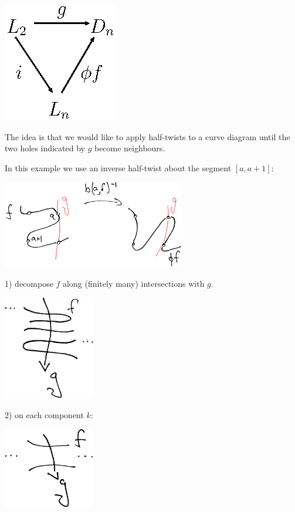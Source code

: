 \documentclass[12pt,a4paper]{article}
\begin{document}
\begin{center}
\includegraphics{halftwist-factor.eps}
\end{center}

The idea is that we would like to apply half-twists to a curve diagram
until the two holes indicated by $g$ become neighbours.


In this example we use an inverse half-twist about the segment $[a, a+1]:$

\begin{center}
\includegraphics[width=0.6\textwidth]{example-problem-1.eps}
\end{center}



1) decompose $f$ along (finitely many) intersections
with $g.$

\begin{center}
\includegraphics[width=0.3\textwidth]{snake-decompose.eps}
\end{center}


2) on each component $k$:

\begin{center}
\includegraphics[width=0.3\textwidth]{snake-component.eps}
\end{center}
\end{document}
